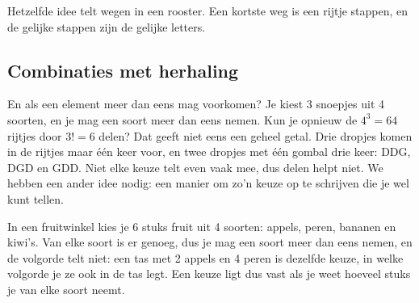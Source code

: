 Hetzelfde idee telt wegen in een rooster. Een kortste weg is een rijtje stappen, en de gelijke stappen zijn de gelijke letters.


\begin{oefeningen}
\end{oefeningen}

\subsection{Combinaties met herhaling}

En als een element meer dan eens mag voorkomen? Je kiest 3 snoepjes uit 4 soorten, en je mag een soort meer dan eens nemen. Kun je opnieuw de $4^3 = 64$ rijtjes door $3! = 6$ delen? Dat geeft niet eens een geheel getal. Drie dropjes komen in de rijtjes maar één keer voor, en twee dropjes met één gombal drie keer: DDG, DGD en GDD. Niet elke keuze telt even vaak mee, dus delen helpt niet. We hebben een ander idee nodig: een manier om zo'n keuze op te schrijven die je wel kunt tellen.

In een fruitwinkel kies je 6 stuks fruit uit 4 soorten: appels, peren, bananen en kiwi's. Van elke soort is er genoeg, dus je mag een soort meer dan eens nemen, en de volgorde telt niet: een tas met 2 appels en 4 peren is dezelfde keuze, in welke volgorde je ze ook in de tas legt. Een keuze ligt dus vast als je weet hoeveel stuks je van elke soort neemt.

